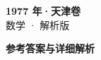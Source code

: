 \documentclass[zihao=-4, a4paper]{ctexart}
\begin{document}
\begin{center}
  {\Large\bfseries 1977 年·天津卷}\\[4pt]
  {\large 数学 · 解析版}
\end{center}
\medskip
{}

\clearpage
{}
\begin{center}{\Large\bfseries 参考答案与详细解析}\end{center}
\medskip

\end{document}
